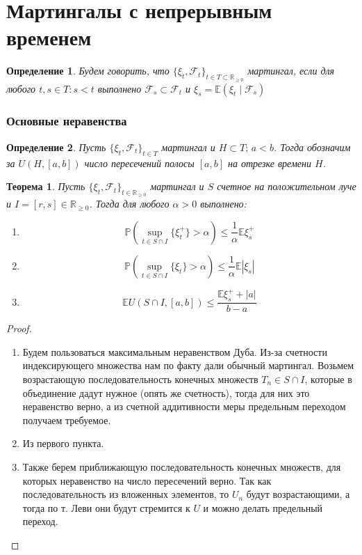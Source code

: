 \documentclass[12pt,a4paper]{article} %
\newtheorem{theorem}{Теорема}
\newtheorem{definition}{Определение}
\newcommand{\R}{\mathbb{R}}
\newcommand{\E}{\mathbb{E}}
\newcommand{\PR}{\mathbb{P}}
\newcommand{\F}{\mathcal{F}}
\begin{document}
	\part{Мартингалы с непрерывным временем}
	\begin{definition}
		Будем говорить, что $\{\xi_t,\F_t\}_{t\in T\subset\R_{\geq0}}$ мартингал, если для любого $t,s\in T:s<t$ выполнено $\F_s\subset\F_t$ и $\xi_s=\E(\xi_t\mid\F_s)$
	\end{definition}
	\section{Основные неравенства}
	\begin{definition}
		Пусть $\{\xi_t,\F_t\}_{t\in T}$ мартингал и $H\subset T;\,a<b$. Тогда обозначим за $U(H,[a,b])$ число пересечений полосы $[a,b]$ на отрезке времени $H$.
	\end{definition}
	\begin{theorem}
		Пусть $\{\xi_t,\F_t\}_{t\in\R_{\geq0}}$ мартингал и $S$ счетное на положительном луче и $I=[r,s]\in\R_{\geq0}$. Тогда для любого $\alpha>0$ выполнено:
		\begin{enumerate}
			\item $$\PR(\sup\limits_{t\in S\cap I}\{\xi_t^{+}\}>\alpha)\leq\frac{1}{\alpha}\E\xi_s^{+}$$
			\item $$\PR(\sup\limits_{t\in S\cap I}\{\xi_t\}>\alpha)\leq\frac{1}{\alpha}\E|\xi_s|$$
			\item $$\E U(S\cap I,[a,b])\leq\frac{\E\xi_s^{+}+|a|}{b-a}$$
		\end{enumerate}
	\end{theorem}
	\begin{proof}
		\begin{enumerate}
			\item Будем пользоваться максимальным неравенством Дуба. Из-за счетности индексирующего множества нам по факту дали обычный мартингал. Возьмем возрастающую последовательность конечных множеств $T_n\in S\cap I$, которые в объединение дадут нужное (опять же счетность), тогда для них это неравенство верно, а из счетной аддитивности меры предельным переходом получаем требуемое.
			\item Из первого пункта.
			\item Также берем приближающую последовательность конечных множеств, для которых неравенство на число пересечений верно. Так как последовательность из вложенных элементов, то $U_n$ будут возрастающими, а тогда по т. Леви они будут стремится к $U$ и можно делать предельный переход.
		\end{enumerate}
	\end{proof}
\end{document}
